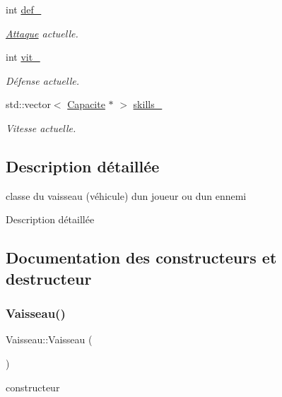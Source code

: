\begin{DoxyCompactItemize}
int \hyperlink{class_vaisseau_abe1d646c91dcd6ad2d84a5d30ea2aeca}{def\+\_\+}
\begin{DoxyCompactList}\small\item\em \hyperlink{class_attaque}{Attaque} actuelle. \end{DoxyCompactList}\item 
int \hyperlink{class_vaisseau_afab28349b10bc1d8c48888f84c4386dd}{vit\+\_\+}
\begin{DoxyCompactList}\small\item\em Défense actuelle. \end{DoxyCompactList}\item 
std\+::vector$<$ \hyperlink{class_capacite}{Capacite} $\ast$ $>$ \hyperlink{class_vaisseau_a7fccd409e1f27f968bbe3f8ee1ded206}{skills\+\_\+}
\begin{DoxyCompactList}\small\item\em Vitesse actuelle. \end{DoxyCompactList}\end{DoxyCompactItemize}


\subsection{Description détaillée}
classe du vaisseau (véhicule) d\textquotesingle{}un joueur ou d\textquotesingle{}un ennemi 

Description détaillée 

\subsection{Documentation des constructeurs et destructeur}
\mbox{\label{class_vaisseau_a86378a70f0d92fcc6c5c5973574b2b7d}} 
\subsubsection{\texorpdfstring{Vaisseau()}{Vaisseau()}}
{\footnotesize\ttfamily Vaisseau\+::\+Vaisseau (\begin{DoxyParamCaption}{ }\end{DoxyParamCaption})\hspace{0.3cm}{\ttfamily [explicit]}}



constructeur 

\mbox{\label{class_vaisseau_ae40b8e0143d6b736065207281bde2e8a}} 
